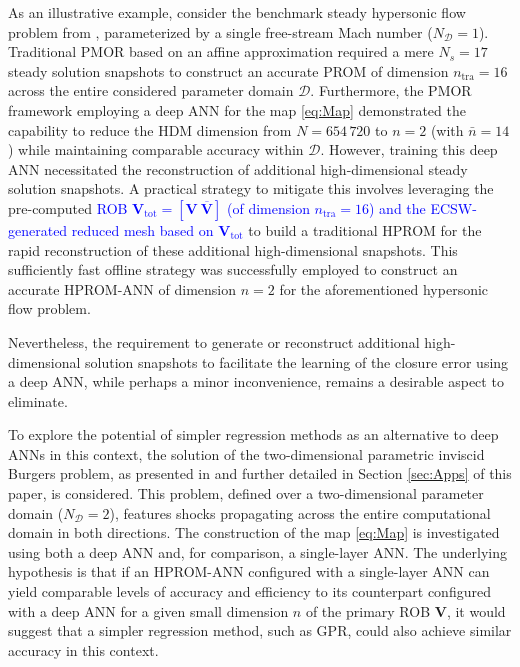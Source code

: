 \documentclass[preprint,10pt]{elsarticle}
\begin{document}
As an illustrative example, consider the benchmark steady hypersonic flow problem from \cite{chmiel2025unified}, parameterized by a 
single free-stream Mach number ($N_{\mathcal D} = 1$). Traditional PMOR based on an affine approximation 
required a mere $N_s = 17$ steady solution snapshots to construct an accurate PROM of dimension $n_\text{tra} = 16$ across the entire considered parameter domain $\mathcal{D}$. Furthermore, 
the PMOR framework employing a deep ANN for the map \eqref{eq:Map} demonstrated the capability to reduce the HDM dimension from $N = 654\,720$ to $n = 2$ (with $\bar n = 14$) while 
maintaining comparable accuracy within $\mathcal{D}$. However, training this deep ANN necessitated the reconstruction of additional high-dimensional steady solution snapshots. A practical strategy to mitigate this involves leveraging the pre-computed \textcolor{blue}{ROB $\mathbf{V}_{\text{tot}}=[\mathbf V\ \overline{\mathbf V}]$ (of dimension $n_{\text{tra}}=16$) and the ECSW-generated reduced mesh based on $\mathbf{V}_{\text{tot}}$} to build a traditional HPROM for the rapid reconstruction of these additional high-dimensional snapshots. This sufficiently fast offline strategy was successfully employed to construct an accurate HPROM-ANN of dimension 
$n=2$ for the aforementioned hypersonic flow problem.

Nevertheless, the requirement to generate or reconstruct additional high-dimensional solution snapshots to facilitate the learning of the closure error using a deep ANN, while perhaps
a minor inconvenience, remains a desirable aspect to eliminate.

To explore the potential of simpler regression methods as an alternative to deep ANNs in this context,
the solution of the two-dimensional parametric inviscid Burgers problem, as presented in \cite{barnett2023neural} and further detailed in Section \ref{sec:Apps} of 
this paper, is considered. This problem, defined over a two-dimensional parameter domain ($N_{\mathcal D} = 2$), features shocks propagating across the entire computational domain in 
both directions. The construction of the map \eqref{eq:Map} is investigated using both a deep ANN and, for comparison, a single-layer ANN. The underlying hypothesis is that if an 
HPROM-ANN configured with a single-layer ANN can yield comparable levels of accuracy and efficiency to its counterpart configured with a deep ANN for a given small dimension $n$ of 
the primary ROB $\mathbf{V}$, it would suggest that a simpler regression method, such as GPR, could also achieve similar accuracy in this context.
\end{document}
